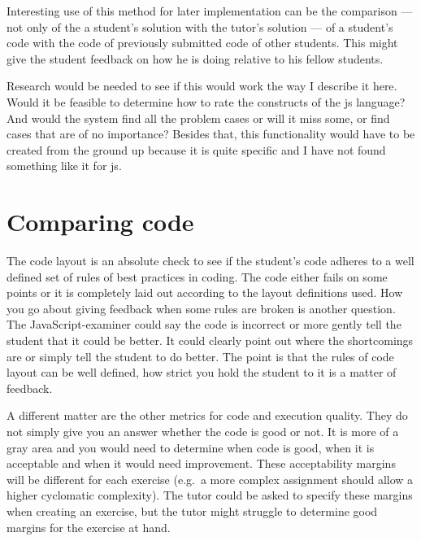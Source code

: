 Interesting use of this method for later implementation can be the comparison
--- not only of the a \gls{student}'s \gls{solution}
with the \gls{tutor}'s \gls{solution} ---
of a \gls{student}'s \gls{code} with the \gls{code}
of previously submitted \gls{code} of other \glspl{student}.
This might give the \gls{student} \gls{feedback} on how he is doing
relative to his fellow \glspl{student}.

Research would be needed to see if this would work
the way I describe it here.
Would it be feasible to determine how to rate the \glspl{construct}
of the \gls{js} language?
And would the system find all the problem cases or will it miss some,
or find cases that are of no importance?
Besides that, this functionality would have to be created from the ground up
because it is quite specific and I have not found something like it
for \gls{js}.

\section{Comparing code}

The code layout is an absolute check to see if the student's code adheres to a
well defined set of rules of best practices in coding. The code either fails on
some points or it is completely laid out according to the layout definitions
used. How you go about giving feedback when some rules are broken is another
question. The JavaScript-examiner could say the code is incorrect or more
gently tell the student that it could be better. It could clearly point out
where the shortcomings are or simply tell the student to do better. The point
is that the rules of code layout can be well defined, how strict you hold the
student to it is a matter of feedback.

A different matter are the other metrics for code and execution quality. They
do not simply give you an answer whether the code is good or not. It is more of
a gray area and you would need to determine when code is good, when it is
acceptable and when it would need improvement. These acceptability margins will
be different for each exercise (e.g.\ a more complex assignment should allow a
higher cyclomatic complexity). The tutor could be asked to specify these
margins when creating an exercise, but the tutor might struggle to determine
good margins for the exercise at hand.

